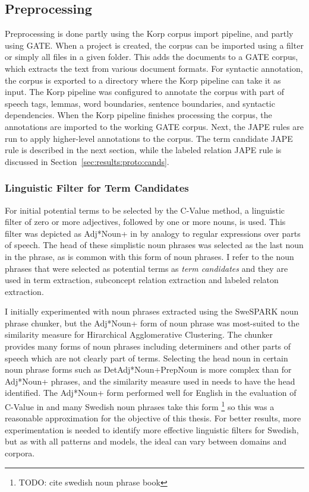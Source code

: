 \documentclass[a4paper]{report}
\newcommand{\todo}[1]{\footnote{{\color{red} TODO: #1}}}
\begin{document}
\subsection{Preprocessing}
Preprocessing is done partly using the Korp corpus import pipeline, and partly using GATE.
When a project is created, the corpus can be imported using a filter or simply all files in a given folder.
This adds the documents to a GATE corpus, which extracts the text from various document formats.
For syntactic annotation, the corpus is exported to a directory where the Korp pipeline can take it as input.
The Korp pipeline was configured to annotate the corpus with part of speech tags, lemmas, word boundaries, sentence boundaries, and syntactic dependencies.
When the Korp pipeline finishes processing the corpus, the annotations are imported to the working GATE corpus.
Next, the JAPE rules are run to apply higher-level annotations to the corpus.
The term candidate JAPE rule is described in the next section, while the labeled relation JAPE rule is discussed in Section~\ref{sec:results:proto:cands}.

\subsubsection{Linguistic Filter for Term Candidates}
\label{sec:results:proto:prepr}

For initial potential terms to be selected by the C-Value method, a linguistic filter of zero or more adjectives, followed by one or more nouns, is used.
This filter was depicted as Adj*Noun+ in \cite{Frantzi98CNCValue} by analogy to regular expressions over parts of speech.
The head of these simplistic noun phrases was selected as the last noun in the phrase, as is common with this form of noun phrases.
I refer to the noun phrases that were selected as potential terms as \emph{term candidates} and they are used in term extraction, subconcept relation extraction and labeled relaton extraction.

I initially experimented with noun phrases extracted using the SweSPARK noun phrase chunker, but the Adj*Noun+ form of noun phrase was most-suited to the similarity measure for Hirarchical Agglomerative Clustering.
The chunker provides many forms of noun phrases including determiners and other parts of speech which are not clearly part of terms.
Selecting the head noun in certain noun phrase forms such as DetAdj*Noun+PrepNoun is more complex than for Adj*Noun+ phrases, and the similarity measure used in \cite{Drymonas10OntoGain} needs to have the head identified.
The Adj*Noun+ form performed well for English in the evaluation of C-Value in \cite{Frantzi98CNCValue} and many Swedish noun phrases take this form \todo{cite swedish noun phrase book} so this was a reasonable approximation for the objective of this thesis.
For better results, more experimentation is needed to identify more effective linguistic filters for Swedish, but as with all patterns and models, the ideal can vary between domains and corpora.
\end{document}
